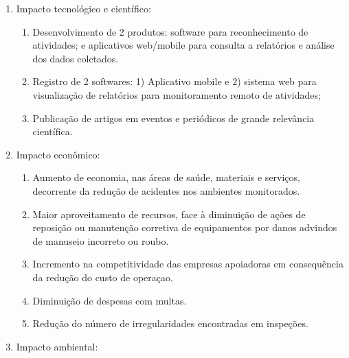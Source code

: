 \begin{enumerate}
	\item Impacto tecnológico e científico:
		\begin{enumerate}
			\item Desenvolvimento de 2 produtos: software para reconhecimento de atividades; e aplicativos web/mobile para consulta a relatórios e análise dos dados coletados.
			\item Registro de 2 softwares: 1) Aplicativo mobile e 2) sistema web para visualização de relatórios para monitoramento remoto de atividades; 
			\item Publicação de artigos em eventos e periódicos de grande relevância científica.
		\end{enumerate}
	\item Impacto econômico:
		\begin{enumerate}
			\item Aumento de economia, nas áreas de saúde, materiais e serviços, decorrente da redução de acidentes nos ambientes monitorados.
			\item Maior aproveitamento de recursos, face à diminuição de ações de reposição ou manutenção corretiva de equipamentos por danos advindos de manuseio incorreto ou roubo.
			\item Incremento na competitividade das empresas apoiadoras em consequência da redução do custo de operaçao.
			\item Diminuição de despesas com multas.
			\item Redução do número de irregularidades encontradas em inspeções.
		\end{enumerate}
	\item Impacto ambiental:
		\begin{enumerate}

\end{enumerate}
\end{enumerate}
